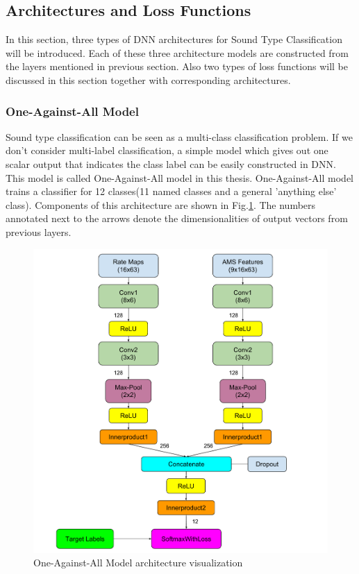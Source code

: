 \subsection{Architectures and Loss Functions}
In this section, three types of DNN architectures for Sound Type Classification will be introduced. Each of these three architecture models are constructed from the layers mentioned in previous section. Also two types of loss functions will be discussed in this section together with corresponding architectures.
\subsubsection{One-Against-All Model}
Sound type classification can be seen as a multi-class classification problem. If we don't consider multi-label classification, a simple model which gives out one scalar output that indicates the class label can be easily constructed in DNN. This model is called One-Against-All model in this thesis. One-Against-All model trains a classifier for 12 classes(11 named classes and a general 'anything else' class). Components of this architecture are shown in Fig.\ref{fig:one-vs-all}. The numbers annotated next to the arrows denote the dimensionalities of output vectors from previous layers.
\begin{figure}[h!]
	\centering 
	\includegraphics[scale=0.5]{../image/chapter2/Architecture1.pdf}
	\caption{One-Against-All Model architecture visualization}
	\label{fig:one-vs-all}
\end{figure}
